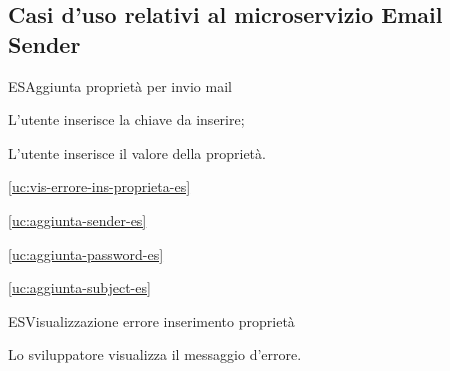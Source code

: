 \subsection{Casi d'uso relativi al microservizio Email Sender}

\begin{usecase}{1}{ES}{Aggiunta proprietà per invio mail}



	\begin{ucscenarioprincipale}
		\item L'utente inserisce la chiave da inserire;
		\item L'utente inserisce il valore della proprietà.
	\end{ucscenarioprincipale}


	\begin{ucestensioni}
		\item \ref{uc:vis-errore-ins-proprieta-es}
	\end{ucestensioni}

	\begin{ucgeneralizzazioni}
		\item \ref{uc:aggiunta-sender-es}
		\item \ref{uc:aggiunta-password-es}
		\item \ref{uc:aggiunta-subject-es}
	\end{ucgeneralizzazioni}

	\label{uc:aggiunta-proprieta-es}
\end{usecase}

\begin{usecase}{2}{ES}{Visualizzazione errore inserimento proprietà}



	\begin{ucscenarioprincipale}
		\item Lo sviluppatore visualizza il messaggio d'errore.
	\end{ucscenarioprincipale}


	\label{uc:vis-errore-ins-proprieta-es}
\end{usecase}

